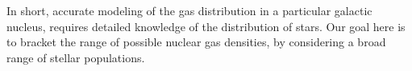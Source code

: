 \documentclass[usenatbib,fleqn]{mnras}
\begin{document}
In short, accurate modeling of the gas distribution in a particular
galactic nucleus, requires detailed knowledge of the distribution of
stars. Our goal here is to bracket the range of possible nuclear gas
densities, by considering a broad range of stellar populations.



\end{document}
